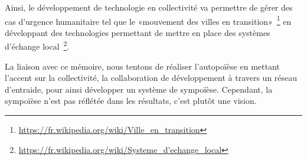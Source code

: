 Ainsi, le développement de technologie en collectivité va permettre de gérer des cas d'urgence humanitaire tel que le «mouvement des villes en transition»~\cite{MOUV_063_0130}\footnote{\url{https://fr.wikipedia.org/wiki/Ville_en_transition}} en développant des technologies permettant de mettre en place des systèmes d'échange local~\cite{cibois2010compte}\footnote{\url{https://fr.wikipedia.org/wiki/Systeme_d'echange_local}}.

La liaison avec ce mémoire, nous tentons de réaliser l'autopoïèse en mettant l'accent sur la collectivité, la collaboration de développement à travers un réseau d'entraide, pour ainsi développer un système de sympoïèse. Cependant, la sympoïèse n'est pas réflétée dans les résultats, c'est plutôt une vision.






